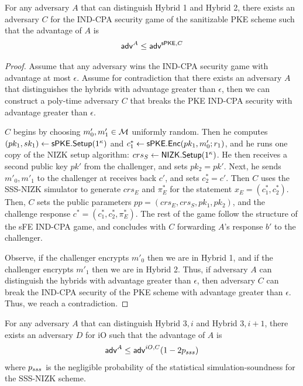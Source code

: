 \documentclass{llncs}
\begin{document}
\begin{claim} \label{claim:sFE_IND-CPA_PKE_1}
For any adversary $A$ that can distinguish Hybrid 1 and Hybrid 2, there exists an adversary $C$ for the IND-CPA security game of the sanitizable PKE scheme such that the advantage of $A$ is
	\begin{align*}
	\mathsf{adv}^{A} \leq \mathsf{adv}^{\mathsf{sPKE},C}
	\end{align*}
\end{claim}

\begin{proof}
Assume that any adversary wins the IND-CPA security game with advantage at most $\epsilon$.
Assume for contradiction that there exists an adversary $A$ that distinguishes the hybrids with advantage greater than $\epsilon$, then we can construct a poly-time adversary $C$ that breaks the PKE IND-CPA security with advantage greater than $\epsilon$. 

$C$ begins by choosing $m'_0,m'_1 \in \mathcal{M}$ uniformly random. Then he computes $(pk_1,sk_1) \leftarrow \mathsf{sPKE}.\mathsf{Setup}(1^\kappa)$ and $c_1^* \leftarrow \mathsf{sPKE}.\mathsf{Enc}(pk_1,m'_0;r_1)$, and he runs one copy of the NIZK setup algorithm: $crs_S \leftarrow \mathsf{NIZK}.\mathsf{Setup}(1^\kappa)$. He then receives a second public key $pk'$ from the challenger, and sets $pk_2 = pk'$. Next, he sends $m'_0,m'_1$ to the challenger at receives back $c'$, and sets $c_2^* = c'$. Then $C$ uses the SSS-NIZK simulator to generate $crs_E$ and $\pi_E^*$ for the statement $x_E = (c_1^*,c_2^*)$. Then, $C$ sets the public parameters $pp = (crs_E,crs_S,pk_1,pk_2)$, and the challenge response $c^* = (c_1^*,c_2^*,\pi_E^*)$. 
The rest of the game follow the structure of the sFE IND-CPA game, and concludes with $C$ forwarding $A$'s response $b'$ to the challenger. 

Observe, if the challenger encrypts $m'_0$ then we are in Hybrid 1, and if the challenger encrypts $m'_1$ then we are in Hybrid 2. Thus, if adversary $A$ can distinguish the hybrids with advantage greater than $\epsilon$, then adversary $C$ can break the IND-CPA security of the PKE scheme with advantage greater than $\epsilon$. Thus, we reach a contradiction.
\end{proof}


\begin{claim} \label{claim:sFE_IND-CPA_iO_1}
For any adversary $A$ that can distinguish Hybrid $3,i$ and Hybrid $3,i+1$, there exists an adversary $D$ for iO such that the advantage of $A$ is
	\begin{align*}
	\mathsf{adv}^{A} \leq \mathsf{adv}^{iO,C} (1 - 2p_{sss})
	\end{align*}
	where $p_{sss}$ is the negligible probability of the statistical simulation-soundness for the SSS-NIZK scheme.
\end{claim}
\end{document}
